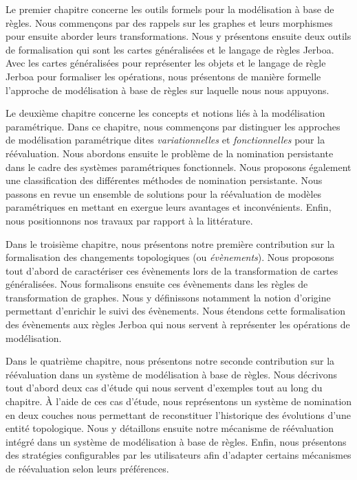 Le premier chapitre concerne les outils formels pour la modélisation à base de
règles. %
Nous commençons par des rappels sur les graphes et leurs morphismes pour ensuite
aborder leurs transformations. %
Nous y présentons ensuite deux outils de formalisation qui sont les cartes
généralisées et le langage de règles Jerboa. %
Avec les cartes généralisées pour représenter les objets et le langage de règle
Jerboa pour formaliser les opérations, nous présentons de manière formelle
l'approche de modélisation à base de règles sur laquelle nous nous appuyons. %


Le deuxième chapitre concerne les concepts et notions liés à la modélisation
paramétrique. %
Dans ce chapitre, nous commençons par distinguer les approches de modélisation
paramétrique dites \textit{variationnelles} et \textit{fonctionnelles} pour la
réévaluation. %
Nous abordons ensuite le problème de la nomination persistante dans le cadre des
systèmes paramétriques fonctionnels. %
Nous proposons également une classification des différentes méthodes de
nomination persistante. %
Nous passons en revue un ensemble de solutions pour la réévaluation de modèles
paramétriques en mettant en exergue leurs avantages et inconvénients. %
Enfin, nous positionnons nos travaux par rapport à la littérature. %


Dans le troisième chapitre, nous présentons notre première contribution sur la
formalisation des changements topologiques (ou \textit{évènements}). %
Nous proposons tout d'abord de caractériser ces évènements lors de
la transformation de cartes généralisées. %
Nous formalisons ensuite ces évènements dans les règles de transformation de
graphes. %
Nous y définissons notamment la notion d'origine permettant d'enrichir le suivi
des évènements. %
Nous étendons cette formalisation des évènements aux règles Jerboa qui nous
servent à représenter les opérations de modélisation. %


Dans le quatrième chapitre, nous présentons notre seconde contribution sur la
réévaluation dans un système de modélisation à base de règles. %
Nous décrivons tout d'abord deux cas d'étude qui nous servent d'exemples tout
au long du chapitre. %
À l'aide de ces cas d'étude, nous représentons un système de nomination en deux
couches nous permettant de reconstituer l'historique des évolutions d'une entité
topologique. %
Nous y détaillons ensuite notre mécanisme de réévaluation intégré dans un
système de modélisation à base de règles. %
Enfin, nous présentons des stratégies configurables par les utilisateurs afin
d'adapter certains mécanismes de réévaluation selon leurs préférences. %


